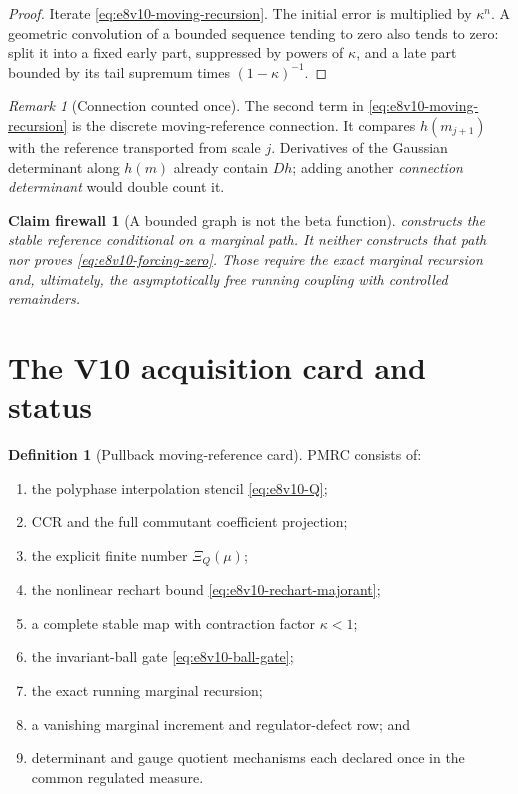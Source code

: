 \documentclass[11pt,oneside]{book}
\newtheorem{firewall}[theorem]{Claim firewall}
\theoremstyle{definition}
\newtheorem{definition}[theorem]{Definition}
\theoremstyle{remark}
\newtheorem{remark}[theorem]{Remark}
\begin{document}
\begin{proof}
Iterate \eqref{eq:e8v10-moving-recursion}.  The initial error is
multiplied by \(\kappa^n\).  A geometric convolution of a bounded
sequence tending to zero also tends to zero: split it into a fixed
early part, suppressed by powers of \(\kappa\), and a late part
bounded by its tail supremum times \((1-\kappa)^{-1}\).
\end{proof}

\begin{remark}[Connection counted once]
\label{rem:e8v10-connection}
The second term in \eqref{eq:e8v10-moving-recursion} is the discrete
moving-reference connection.  It compares \(h(m_{j+1})\) with the
reference transported from scale \(j\).  Derivatives of the Gaussian
determinant along \(h(m)\) already contain \(Dh\); adding another
\emph{connection determinant} would double count it.
\end{remark}

\begin{firewall}[A bounded graph is not the beta function]
\label{fire:e8v10-beta}
 constructs the stable reference
conditional on a marginal path.  It neither constructs that path nor
proves \eqref{eq:e8v10-forcing-zero}.  Those require the exact
marginal recursion and, ultimately, the asymptotically free running
coupling with controlled remainders.
\end{firewall}

\section{The V10 acquisition card and status}
\label{sec:e8v10-status}

\begin{definition}[Pullback moving-reference card]
\label{def:e8v10-card}
PMRC consists of:
\begin{enumerate}[label=\textup{(M\arabic*)},leftmargin=4em]
\item the polyphase interpolation stencil \eqref{eq:e8v10-Q};
\item CCR and the full commutant coefficient projection;
\item the explicit finite number \(\Xi_Q(\mu)\);
\item the nonlinear rechart bound
      \eqref{eq:e8v10-rechart-majorant};
\item a complete stable map with contraction factor \(\kappa<1\);
\item the invariant-ball gate \eqref{eq:e8v10-ball-gate};
\item the exact running marginal recursion;
\item a vanishing marginal increment and regulator-defect row; and
\item determinant and gauge quotient mechanisms each declared once
      in the common regulated measure.
\end{enumerate}
\end{definition}
\end{document}
